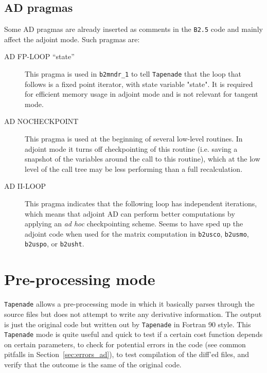 \subsection{AD pragmas}

Some AD pragmas are already inserted as comments in the {\tt B2.5} code and mainly affect the adjoint mode. Such pragmas are:
\begin{description}
  \item[AD FP-LOOP ``state''] This pragma is used in {\tt b2mndr\_1} to tell {\tt Tapenade} that the loop that follows is a fixed point iterator, with state variable "state". It is required for efficient memory usage in adjoint mode and is not relevant for tangent mode.

  \item[AD NOCHECKPOINT] This pragma is used at the beginning of several low-level routines. In adjoint mode it turns off checkpointing of this routine (i.e. saving a snapshot of the variables around the call to this routine), which at the low level of the call tree may be less performing than a full recalculation.

  \item[AD II-LOOP] This pragma indicates that the following loop has independent iterations, which means that adjoint AD can perform better computations by applying an {\it ad hoc} checkpointing scheme. Seems to have sped up the adjoint code when used for the matrix computation in {\tt b2usco}, {\tt b2usmo}, {\tt b2uspo}, or {\tt b2usht}.
\end{description}

\section{Pre-processing mode}

{\tt Tapenade} allows a pre-processing mode in which it basically parses through the source files but does not attempt to write any derivative information. The output is just the original code but written out by {\tt Tapenade} in Fortran 90 style. This {\tt Tapenade} mode is quite useful and quick to test if a certain cost function depends on certain parameters, to check for potential errors in the code (see common pitfalls in Section~\ref{sec:errors_ad}), to test compilation of the diff'ed files, and verify that the outcome is the same of the original code.

